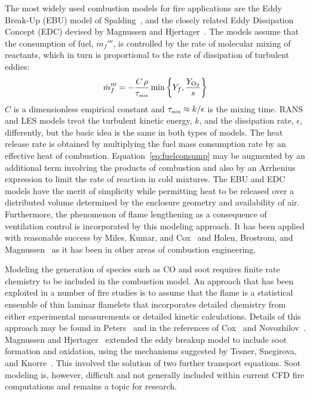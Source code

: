 \documentclass[graybox]{svmult}
\begin{document}
The most widely used combustion models for fire applications are the Eddy Break-Up (EBU) model of Spalding~\cite{Spalding:1971}, and the closely related Eddy Dissipation Concept (EDC) devised by Magnussen and Hjertager~\cite{Magnussen}. The models assume that the consumption of fuel, $\dot{m}_f'''$, is controlled by the rate of molecular mixing of reactants, which in turn is proportional to the rate of dissipation of turbulent eddies:
\begin{equation}
\dot{m}_f''' = - \frac{C \, \rho}{\tau_{\hbox{\tiny mix}}} \min \left\{ Y_f, \frac{Y_{\mathrm{O_2}}}{s} \right\}
\label{eq:fuelconsump}
\end{equation}
$C$ is a dimensionless empirical constant and $\tau_{\hbox{\tiny mix}} \approx k/\epsilon$ is the mixing time. RANS and LES models treat the turbulent kinetic energy, $k$, and the dissipation rate, $\epsilon$, differently, but the basic idea is the same in both types of models. The heat release rate is obtained by multiplying the fuel mass consumption rate by an effective heat of combustion. Equation~\ref{eq:fuelconsump} may be augmented by an additional term involving the products of combustion and also by an Arrhenius expression to limit the rate of reaction in cold mixtures. The EBU and EDC models have the merit of simplicity while permitting heat to be released over a distributed volume determined by the enclosure geometry and availability of air. Furthermore, the phenomenon of flame lengthening as a consequence of ventilation control is incorporated by this modeling approach. It has been applied with reasonable success by Miles, Kumar, and Cox~\cite{Miles} and Holen, Brostrom, and Magnussen~\cite{Holen} as it has been in other areas of combustion engineering.

Modeling the generation of species such as CO and soot requires finite rate chemistry to be included in the combustion model. An approach that has been exploited in a number of fire studies is to assume that the flame is a statistical ensemble of thin laminar flamelets that incorporates detailed chemistry from either experimental measurements or detailed kinetic calculations. Details of this approach may be found in Peters~\cite{Peters} and in the references of Cox~\cite{Cox:1998} and Novozhilov~\cite{Novozhilov}. Magnussen and Hjertager~\cite{Magnussen} extended the eddy breakup model to include soot formation and oxidation, using the mechanisms suggested by Tesner, Snegirova, and Knorre~\cite{Tesner}. This involved the solution of two further transport equations. Soot modeling is, however, difficult and not generally included within current CFD fire computations and remains a topic for research.
\end{document}
